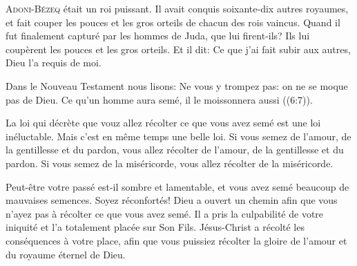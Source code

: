 \dvrule







\lettrine{A}{doni-Bézeq} était un roi puissant.
 Il avait conquis soixante-dix autres royaumes, et fait couper les pouces
 et les gros orteils de chacun des rois vaincus.
 Quand il fut finalement capturé par les hommes de Juda, que lui firent-ils?
 Ils lui coupèrent les pouces et les gros orteils.
 Et il dit: \Og Ce que j'ai fait subir aux autres, Dieu l'a requis de moi. \Fg{}

Dans le Nouveau Testament nous lisons:
 \Og Ne vous y trompez pas: on ne se moque pas de Dieu.
 Ce qu'un homme aura semé, il le moissonnera aussi \Fg{} ((6:7)).


La loi qui décrète que vouz allez récolter ce que vous avez semé est une loi inéluctable.
 Mais c'est en même temps une belle loi.
 Si vous semez de l'amour, de la gentillesse et du pardon,
 vous allez récolter de l'amour, de la gentillesse et du pardon.
 Si vous semez de la miséricorde, vous allez récolter de la miséricorde.

Peut-être votre passé est-il sombre et lamentable,
 et vous avez semé beaucoup de mauvaises semences.
 Soyez réconfortés!
 Dieu a ouvert un chemin afin que vous n'ayez pas à récolter
 ce que vous avez semé.
 Il a pris la culpabilité de votre iniquité et l'a totalement placée
 sur Son Fils.
 Jésus-Christ a récolté les conséquences à votre place,
 afin que vous puissiez récolter la gloire de l'amour
 et du royaume éternel de Dieu. 

